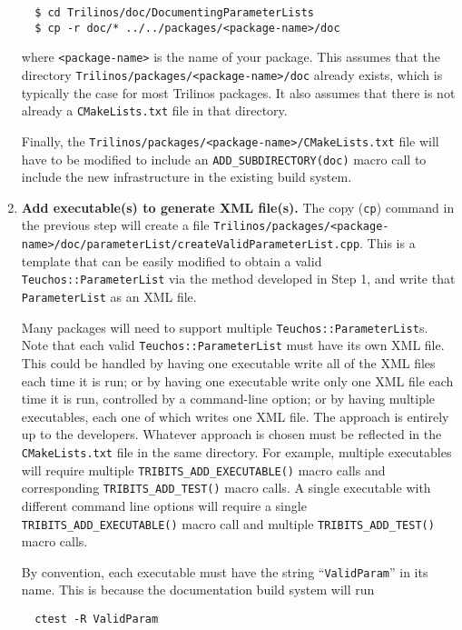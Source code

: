 \documentclass[pdf,ps2pdf,12pt]{smemo}
\begin{document}
\begin{memo}
\begin{enumerate}
 \begin{verbatim}
  $ cd Trilinos/doc/DocumentingParameterLists
  $ cp -r doc/* ../../packages/<package-name>/doc
 \end{verbatim}

  where \texttt{<package-name>} is the name of your package. This
  assumes that the directory
  \texttt{Trilinos/packages/<package-name>/doc} already exists, which
  is typically the case for most Trilinos packages.  It also assumes
  that there is not already a \texttt{CMakeLists.txt} file in that
  directory.

  Finally, the
  \texttt{Trilinos/packages/<package-name>/CMakeLists.txt} file will
  have to be modified to include an \texttt{ADD\_SUBDIRECTORY(doc)}
  macro call to include the new infrastructure in the existing build
  system.

\item \textbf{Add executable(s) to generate XML file(s).} The copy
  (\texttt{cp}) command in the previous step will create a file
  \texttt{Trilinos/packages/<package-name>/doc/parameter\-List/\-create\-Valid\-Parameter\-List.cpp}.
  This is a template that can be easily modified to obtain a valid
  \texttt{Teuchos::ParameterList} via the method developed in Step 1,
  and write that \texttt{ParameterList} as an XML file.

  Many packages will need to support multiple
  \texttt{Teuchos::ParameterList}s.  Note that each valid
  \texttt{Teuchos::ParameterList} must have its own XML file.  This
  could be handled by having one executable write all of the XML files
  each time it is run; or by having one executable write only one XML
  file each time it is run, controlled by a command-line option; or by
  having multiple executables, each one of which writes one XML
  file. The approach is entirely up to the developers.  Whatever
  approach is chosen must be reflected in the \texttt{CMakeLists.txt}
  file in the same directory. For example, multiple executables will
  require multiple \texttt{TRIBITS\_ADD\_EXECUTABLE()} macro calls and
  corresponding \texttt{TRIBITS\_ADD\_TEST()} macro calls.  A single
  executable with different command line options will require a single
  \texttt{TRIBITS\_ADD\_EXECUTABLE()} macro call and multiple
  \texttt{TRIBITS\_ADD\_TEST()} macro calls.

  By convention, each executable must have the string
  ``\texttt{ValidParam}'' in its name.  This is because the
  documentation build system will run

 \begin{verbatim}
  ctest -R ValidParam
 \end{verbatim}


\end{enumerate}
\end{memo}
\end{document}
